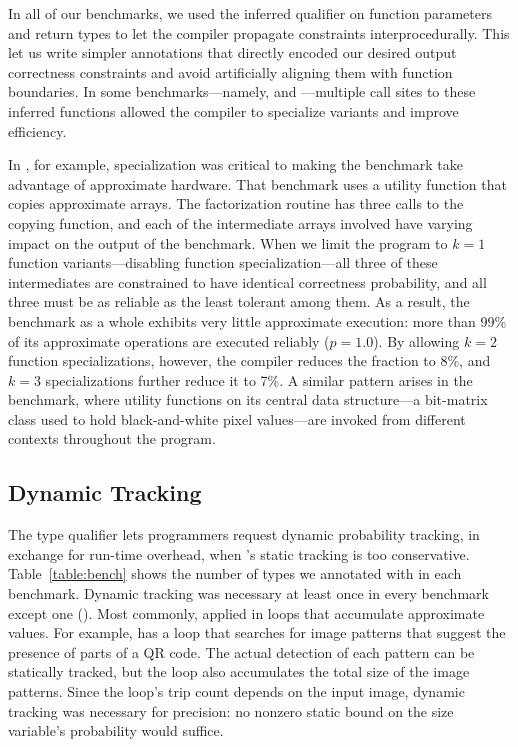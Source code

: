 {In all of our benchmarks, we used the inferred  qualifier on
function parameters and return types to let the compiler propagate constraints
interprocedurally.
This let us write simpler annotations that directly encoded our desired output
correctness constraints and avoid artificially aligning them with function
boundaries.
In some benchmarks---namely,  and ---multiple call
sites to these inferred functions allowed the compiler to specialize variants
and improve efficiency.

In , for example, specialization was critical to making the
benchmark take advantage of approximate hardware.
That benchmark uses a utility function that copies approximate arrays.
The factorization routine has three calls to the copying function, and each of
the intermediate arrays involved have varying impact on the output of the
benchmark.
When we limit the program to $k=1$ function variants---disabling function
specialization---all three of these intermediates are constrained to
have identical correctness probability, and all three must be as reliable as
the least tolerant among them.
As a result, the benchmark as a whole exhibits very little approximate
execution: more than 99\% of its approximate operations are executed reliably
($p = 1.0$).
By allowing $k=2$ function specializations, however, the compiler reduces the
fraction to 8\%, and $k=3$ specializations further reduce it to 7\%.
A similar pattern arises in the  benchmark, where utility functions
on its central data structure---a bit-matrix class used to hold
black-and-white pixel values---are invoked from different contexts
throughout the program.


\subsection{Dynamic Tracking}

The  type qualifier lets programmers request dynamic
probability tracking, in exchange for run-time overhead, when \lang's static
tracking is too conservative.
Table~\ref{table:bench} shows the number of types we annotated with
 in each benchmark.
Dynamic tracking was necessary at least once in every benchmark except one
().
Most commonly,  applied in loops that accumulate approximate
values.
For example,  has a loop that searches for image patterns that
suggest the presence of parts of a QR code.
The actual detection of each pattern can be statically tracked, but the loop
also accumulates the total size of the image patterns.
Since the loop's trip count depends on the input image, dynamic tracking was
necessary for precision:
no nonzero static bound on the size variable's probability would suffice.

}
